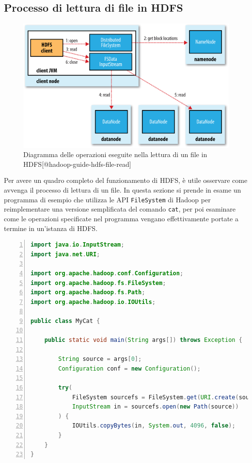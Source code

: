 \documentclass[italian,a4paper, twoside, 12pt]{report}
\begin{document}
\subsection{Processo di lettura di file in
HDFS}\label{processo-di-lettura-di-file-in-hdfs}

\begin{figure}
\centering
\includegraphics{img/hdfs-file-read.png}
\caption{Diagramma delle operazioni eseguite nella lettura di un file in
HDFS{[}@hadoop-guide-hdfs-file-read{]}}
\end{figure}

Per avere un quadro completo del funzionamento di HDFS, è utile
osservare come avvenga il processo di lettura di un file. In questa
sezione si prende in esame un programma di esempio che utilizza le API
\lstinline!FileSystem! di Hadoop per reimplementare una versione
semplificata del comando \lstinline!cat!, per poi esaminare come le
operazioni specificate nel programma vengano effettivamente portate a
termine in un'istanza di HDFS.

\begin{codelisting}

\caption{Programma di esempio che reimplementa il comando
\lstinline!cat!.}

\begin{lstlisting}[language=Java, numbers=left, label=lst:hdfs-cat]
import java.io.InputStream;
import java.net.URI;

import org.apache.hadoop.conf.Configuration;
import org.apache.hadoop.fs.FileSystem;
import org.apache.hadoop.fs.Path;
import org.apache.hadoop.io.IOUtils;

public class MyCat {

    public static void main(String args[]) throws Exception {

        String source = args[0];
        Configuration conf = new Configuration();

        try(
            FileSystem sourcefs = FileSystem.get(URI.create(source), conf);
            InputStream in = sourcefs.open(new Path(source))
        ) {
            IOUtils.copyBytes(in, System.out, 4096, false);
        }
    }
}
\end{lstlisting}

\end{codelisting}
\end{document}
